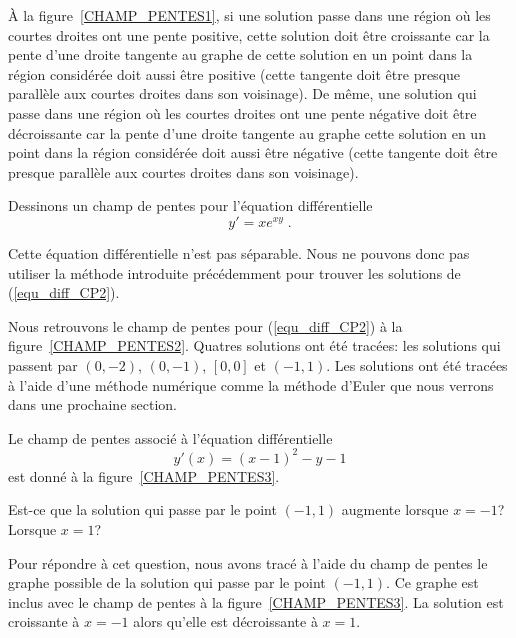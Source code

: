 {

À la figure~\ref{CHAMP_PENTES1}, si une solution passe dans une région
où les courtes droites ont une pente positive, cette solution doit
être croissante car la pente d'une droite tangente au graphe de cette
solution en un point dans la région considérée doit aussi être
positive (cette tangente doit être presque parallèle aux courtes droites
dans son voisinage).  De même, une solution qui passe dans une région
où les courtes droites ont une pente négative doit
être décroissante car la pente d'une droite tangente au graphe cette
solution en un point dans la région considérée doit aussi être
négative (cette tangente doit être presque parallèle aux courtes
droites dans son voisinage).

\begin{egg}
Dessinons un champ de pentes pour l'équation différentielle
\begin{equation}\label{equ_diff_CP2}
y'= x e^{xy} \; .
\end{equation}

Cette équation différentielle n'est pas séparable.  Nous ne pouvons donc
pas utiliser la méthode introduite précédemment pour trouver les
solutions de (\ref{equ_diff_CP2}).

Nous retrouvons le champ de pentes pour (\ref{equ_diff_CP2}) à la
figure~\ref{CHAMP_PENTES2}.  Quatres solutions ont été tracées: les
solutions qui passent par $(0,-2)$, $(0,-1)$, $[0,0]$ et $(-1,1)$.
Les solutions ont été tracées à l'aide d'une méthode numérique comme
la méthode d'Euler que nous verrons dans une prochaine section.
\end{egg}


\begin{egg}
Le champ de pentes associé à l'équation différentielle
\begin{equation}\label{x2ym1}
y'(x)=(x-1)^2-y - 1
\end{equation}
est donné à la figure~\ref{CHAMP_PENTES3}.

 Est-ce que la solution qui passe par le point $(-1,1)$
augmente lorsque $x=-1$? Lorsque $x=1$?

Pour répondre à cet question, nous avons tracé à l'aide du champ de
pentes le graphe possible de la solution qui passe par le point
$(-1,1)$.  Ce graphe est inclus avec le champ de pentes à la
figure~\ref{CHAMP_PENTES3}.  La solution est croissante à $x=-1$
alors qu'elle est décroissante à $x=1$.


\end{egg}}
